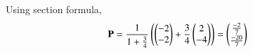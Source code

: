 Using section formula, 
\begin{align}
\mathbf{P}&=\frac{1}{1+\frac{3}{4}}\left(\begin{pmatrix}-2\\-2\end{pmatrix}+\frac{3}{4}\begin{pmatrix}2\\-4\end{pmatrix}\right)
=\begin{pmatrix}\frac{-2}{7}\\[1pt] \frac{-20}{7}\end{pmatrix}
\end{align}

